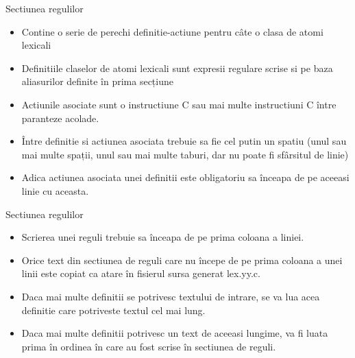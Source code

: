 \documentclass[pdf]{beamer}
\begin{document}
\begin{frame}{Sectiunea regulilor}
\begin{itemize}
\item
Contine o serie de perechi definitie-actiune pentru câte o clasa de atomi lexicali

\item 
Definitiile claselor de atomi lexicali sunt expresii regulare scrise si pe baza aliasurilor definite în prima secțiune

\item
Actiunile asociate sunt o instructiune C sau mai multe instructiuni C între paranteze acolade.

\item
Între definitie si actiunea asociata trebuie sa fie cel putin un spatiu (unul sau mai multe spații, unul sau mai multe taburi, dar nu poate fi sfârsitul de linie)

\item 
Adica actiunea asociata unei definitii este obligatoriu sa înceapa de pe aceeasi linie cu aceasta.

\end{itemize}
\end{frame}



\begin{frame}{Sectiunea regulilor}
\begin{itemize}
\item
Scrierea unei reguli trebuie sa înceapa de pe prima coloana a liniei.

\item
Orice text din sectiunea de reguli care nu începe de pe prima coloana a unei linii este copiat ca atare în fisierul sursa generat lex.yy.c.

\item
Daca mai multe definitii se potrivesc textului de intrare, se va lua acea definitie care potriveste textul cel mai lung.

\item 
Daca mai multe definitii potrivesc un text de aceeasi lungime, va fi luata prima în ordinea în care au fost scrise în sectiunea de reguli.

\end{itemize}
\end{frame}
\end{document}
